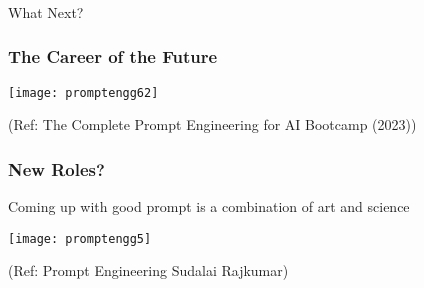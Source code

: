 \begin{frame}[fragile]\frametitle{}
\begin{center}
{\Large What Next?}
\end{center}
\end{frame}

\begin{frame}[fragile]\frametitle{The Career of the Future}

\begin{center}
\texttt{[image: promptengg62]}

{\tiny (Ref: The Complete Prompt Engineering for AI Bootcamp (2023))}

\end{center}				
\end{frame}

\begin{frame}[fragile]\frametitle{New Roles?}

Coming up with good prompt is a combination of art and science

\begin{center}
\texttt{[image: promptengg5]}

{\tiny (Ref: Prompt Engineering Sudalai Rajkumar)}

\end{center}
\end{frame}




